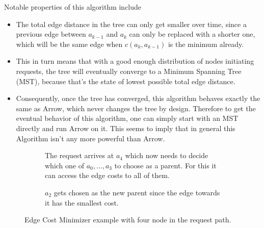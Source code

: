 \documentclass[a4paper, oneside]{discothesis}
\begin{document}
Notable properties of this algorithm include
\begin{itemize}
\item The total edge distance in the tree can only get smaller over time, since a previous edge between $a_{k-1}$ and $a_{k}$ can only be replaced with a shorter one, which will be the same edge when $c(a_{k},a_{k-1})$ is the minimum already.
\item This in turn means that with a good enough distribution of nodes initiating requests, the tree will eventually converge to a Minimum Spanning Tree (MST), because that's the state of lowest possible total edge distance.
\item Consequently, once the tree has converged, this algorithm behaves exactly the same as Arrow, which never changes the tree by design. Therefore to get the eventual behavior of this algorithm, one can simply start with an MST directly and run Arrow on it. This seems to imply that in general this Algorithm isn't any more powerful than Arrow.
\end{itemize}

\begin{figure}
\begin{subfigure}[t]{0.5\textwidth}
\centering
{}
\caption{The request arrives at $a_{4}$ which now needs to decide which one of $a_{0},\dots,a_{3}$ to choose as a parent. For this it can access the edge costs to all of them.}
\end{subfigure}
\quad
\begin{subfigure}[t]{0.5\textwidth}
\centering
{}
\caption{$a_{2}$ gets chosen as the new parent since the edge towards it has the smallest cost.}
\end{subfigure}
\caption{Edge Cost Minimizer example with four node in the request path.}
\label{fig:ecm}
\end{figure}
\end{document}
